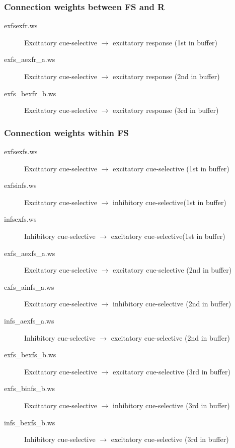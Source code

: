 \documentclass[12pt]{article}
\begin{document}
\subsubsection{Connection weights between FS and R}
\begin{description}
  \item[exfsexfr.ws] Excitatory cue-selective $\rightarrow$
                     excitatory response (1st in buffer)
  \item[exfs\_aexfr\_a.ws] Excitatory cue-selective $\rightarrow$
                     excitatory response (2nd in buffer)
  \item[exfs\_bexfr\_b.ws] Excitatory cue-selective $\rightarrow$
                     excitatory response (3rd in buffer)
\end{description}

\subsubsection{Connection weights within FS}
\begin{description}
  \item[exfsexfs.ws] Excitatory cue-selective $\rightarrow$
                     excitatory cue-selective (1st in buffer)
  \item[exfsinfs.ws] Excitatory cue-selective $\rightarrow$
                     inhibitory cue-selective(1st in buffer)
  \item[infsexfs.ws] Inhibitory cue-selective $\rightarrow$
                     excitatory cue-selective(1st in buffer)
  \item[exfs\_aexfs\_a.ws] Excitatory cue-selective $\rightarrow$
                     excitatory cue-selective (2nd in buffer)
  \item[exfs\_ainfs\_a.ws] Excitatory cue-selective $\rightarrow$
                     inhibitory cue-selective (2nd in buffer)
  \item[infs\_aexfs\_a.ws] Inhibitory cue-selective $\rightarrow$
                     excitatory cue-selective (2nd in buffer)
  \item[exfs\_bexfs\_b.ws] Excitatory cue-selective $\rightarrow$
                     excitatory cue-selective (3rd in buffer)
  \item[exfs\_binfs\_b.ws] Excitatory cue-selective $\rightarrow$
                     inhibitory cue-selective (3rd in buffer)
  \item[infs\_bexfs\_b.ws] Inhibitory cue-selective $\rightarrow$
                     excitatory cue-selective (3rd in buffer)
\end{description}
\end{document}
